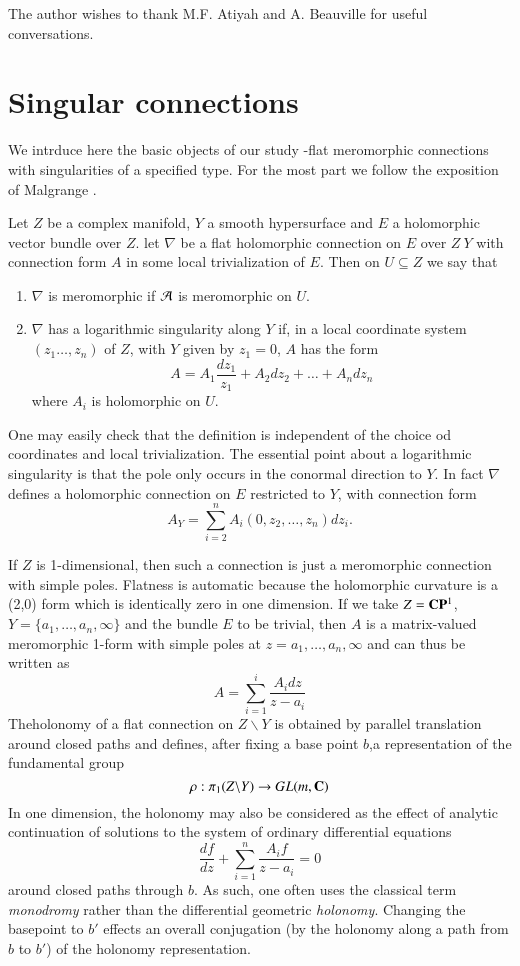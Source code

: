 The author wishes to thank M.F. Atiyah and A. Beauville for useful conversations.

\section{Singular connections}\label{chap7-sec-2}  
We intrduce here the basic objects of our study -flat meromorphic connections with singularities of a specified type. For the most part we follow the exposition of Malgrange \cite{chap7-key10}.

\begin{defn}\label{chap7-definition-1}
Let $Z$ be a complex manifold, $Y$ a smooth hypersurface and $E$ a holomorphic vector bundle over $Z$. let $\nabla$ be a flat holomorphic connection on $E$ over $Z \ Y$ with connection form $A$ in some local trivialization of $E$. Then on $U\subseteq Z$ we say that
\begin{enumerate}[(1)]
\item $\nabla$ is meromorphic if $\mathcal{A}$ is meromorphic on $U$.

\item $\nabla$ has a logarithmic singularity along $Y$ if, in a local coordinate system $(z_{1}\ldots, z_{n})$ of $Z$, with $Y$ given by $z_{1} = 0$, $A$ has the form
$$
A = A_{1}\dfrac{dz_{1}}{z_{1}} + A_{2}dz_{2} + \ldots + A_{n}dz_{n}
$$
where $A_{i}$ is holomorphic on $U$.
\end{enumerate}
\end{defn}

One may easily check that the definition is independent of the choice od coordinates and local trivialization. The essential point about a logarithmic singularity is that the pole only occurs in the conormal direction to $Y$. In fact $\nabla$ defines a holomorphic connection on $E$ restricted to $Y$, with connection form
$$
A_{Y} = \sum\limits_{i=2}^{n}A_{i}(0, z_{2}, \ldots, z_{n})dz_{i}.
$$

If $Z$ is 1-dimensional, then such a connection is just a meromorphic connection with simple poles. Flatness is automatic because the holomorphic curvature is a (2,0) form which is identically zero in one dimension. If we take $Z=\mathbf{C}\mathbf{P}^{1}$, $Y = \{a_{1}, \ldots, a_{n}, \infty\}$ and the bundle $E$ to be trivial, then $A$ is a matrix-valued meromorphic 1-form with simple poles at $z=a_{1},\ldots, a_{n}, \infty$ and can thus be written as
$$
A = \sum\limits_{i =1}^{i}\dfrac{A_{i}dz}{z-a_{i}}
$$
The\pageoriginale holonomy of a flat connection on $Z\backslash Y$ is obtained by parallel translation around closed paths and defines, after fixing a base point $b$,a representation of the fundamental group
$$
\rho : \pi_{1}(Z\backslash Y) \rightarrow GL(m ,\mathbf{C})
$$
In one dimension, the holonomy may also be considered as the effect of analytic continuation of solutions to the system of ordinary differential equations
$$
\dfrac{df}{dz} + \sum\limits_{i=1}^{n} \dfrac{A_{i}f}{z-a_{i}} = 0
$$
around closed paths through $b$. As such, one often uses the classical term \textit{monodromy} rather than the differential geometric \textit{holonomy}. Changing the basepoint to $b'$ effects an overall conjugation (by the holonomy along a path from $b$ to $b'$) of the holonomy representation.

